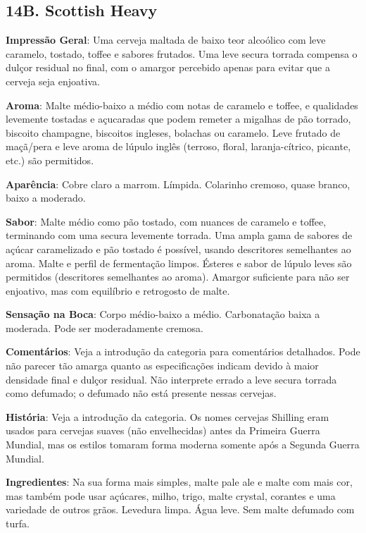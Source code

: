 \subsection*{14B. Scottish Heavy}
\textbf{Impressão Geral}: Uma cerveja maltada de baixo teor alcoólico com leve caramelo, tostado, toffee e sabores frutados. Uma leve secura torrada compensa o dulçor residual no final, com o amargor percebido apenas para evitar que a cerveja seja enjoativa.

\textbf{Aroma}: Malte médio-baixo a médio com notas de caramelo e toffee, e qualidades levemente tostadas e açucaradas que podem remeter a migalhas de pão torrado, biscoito champagne, biscoitos ingleses, bolachas ou caramelo. Leve frutado de maçã/pera e leve aroma de lúpulo inglês (terroso, floral, laranja-cítrico, picante, etc.) são permitidos.

\textbf{Aparência}: Cobre claro a marrom. Límpida. Colarinho cremoso, quase branco, baixo a moderado.

\textbf{Sabor}: Malte médio como pão tostado, com nuances de caramelo e toffee, terminando com uma secura levemente torrada. Uma ampla gama de sabores de açúcar caramelizado e pão tostado é possível, usando descritores semelhantes ao aroma. Malte e perfil de fermentação limpos. Ésteres e sabor de lúpulo leves são permitidos (descritores semelhantes ao aroma). Amargor suficiente para não ser enjoativo, mas com equilíbrio e retrogosto de malte.

\textbf{Sensação na Boca}: Corpo médio-baixo a médio. Carbonatação baixa a moderada. Pode ser moderadamente cremosa.

\textbf{Comentários}: Veja a introdução da categoria para comentários detalhados. Pode não parecer tão amarga quanto as especificações indicam devido à maior densidade final e dulçor residual. Não interprete errado a leve secura torrada como defumado; o defumado não está presente nessas cervejas.

\textbf{História}: Veja a introdução da categoria. Os nomes cervejas Shilling eram usados para cervejas suaves (não envelhecidas) antes da Primeira Guerra Mundial, mas os estilos tomaram forma moderna somente após a Segunda Guerra Mundial.

\textbf{Ingredientes}: Na sua forma mais simples, malte pale ale e malte com mais cor, mas também pode usar açúcares, milho, trigo, malte crystal, corantes e uma variedade de outros grãos. Levedura limpa. Água leve. Sem malte defumado com turfa.


